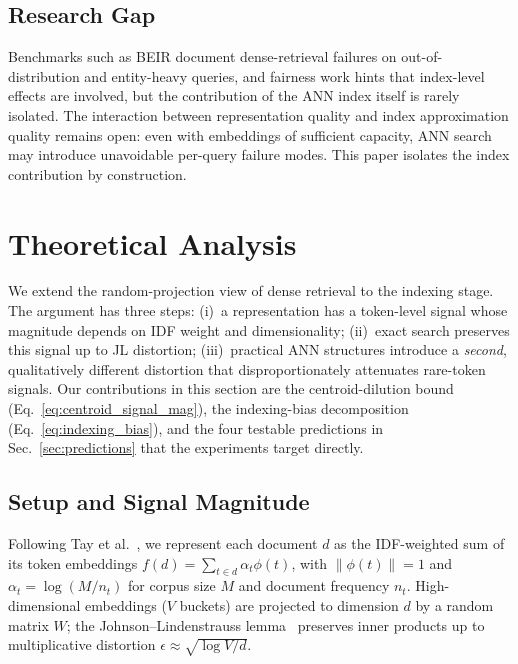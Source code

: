 \documentclass[conference]{IEEEtran}
\begin{document}
\subsection{Research Gap}
Benchmarks such as BEIR \cite{thakur2021beir} document dense-retrieval failures on out-of-distribution and entity-heavy queries, and fairness work \cite{zhan2021understanding} hints that index-level effects are involved, but the contribution of the ANN index itself is rarely isolated. The interaction between representation quality and index approximation quality remains open: even with embeddings of sufficient capacity, ANN search may introduce unavoidable per-query failure modes. This paper isolates the index contribution by construction.

\section{Theoretical Analysis}\label{sec:theory}

We extend the random-projection view of dense retrieval \cite{tay2020sparse} to the indexing stage. The argument has three steps: (i)~a representation has a token-level signal whose magnitude depends on IDF weight and dimensionality; (ii)~exact search preserves this signal up to JL distortion; (iii)~practical ANN structures introduce a \emph{second}, qualitatively different distortion that disproportionately attenuates rare-token signals. Our contributions in this section are the centroid-dilution bound (Eq.~\eqref{eq:centroid_signal_mag}), the indexing-bias decomposition (Eq.~\eqref{eq:indexing_bias}), and the four testable predictions in Sec.~\ref{sec:predictions} that the experiments target directly.

\subsection{Setup and Signal Magnitude}\label{sec:theory-setup}

Following Tay et al.~\cite{tay2020sparse}, we represent each document $d$ as the IDF-weighted sum of its token embeddings $f(d)=\sum_{t\in d}\alpha_t\phi(t)$, with $\|\phi(t)\|=1$ and $\alpha_t=\log(M/n_t)$ for corpus size $M$ and document frequency $n_t$. High-dimensional embeddings ($V$ buckets) are projected to dimension $d$ by a random matrix $W$; the Johnson--Lindenstrauss lemma~\cite{johnson1984extensions} preserves inner products up to multiplicative distortion $\epsilon\approx\sqrt{\log V/d}$.
\end{document}
